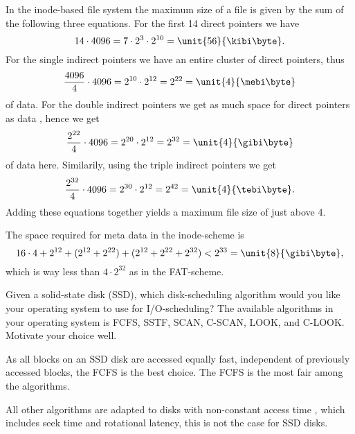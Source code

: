 \documentclass[a4paper]{miunasgn}
\begin{document}
\begin{questions}
\begin{solution}
		In the inode-based file system the maximum size of a file is given by the 
		sum of the following three equations.
		For the first 14 direct pointers we have
		\begin{equation}
			\label{eq:direct}
			14\cdot 4096 = 7\cdot 2^3\cdot 2^{10} = \unit{56}{\kibi\byte}.
		\end{equation}
		For the single indirect pointers we have an entire cluster of direct 
		pointers, thus
		\begin{equation}
			\label{eq:singleindirect}
			\frac{4096}{4}\cdot 4096 = 2^{10}\cdot 2^{12} = 2^{22} 
			= \unit{4}{\mebi\byte}
		\end{equation}
		of data.
		For the double indirect pointers we get as much space for direct pointers 
		as data , hence we get
		\begin{equation}
			\label{eq:doubleindirect}
			\frac{2^{22}}{4}\cdot 4096 = 2^{20}\cdot 2^{12} = 2^{32} 
			= \unit{4}{\gibi\byte}
		\end{equation}
		of data here.
		Similarily, using the triple indirect pointers we get
		\begin{equation}
			\label{eq:tripleindirect}
			\frac{2^{32}}{4}\cdot 4096 = 2^{30}\cdot 2^{12} = 2^{42} 
			= \unit{4}{\tebi\byte}.
		\end{equation}
		Adding these equations together yields a maximum file size of just above 
		\unit{4}{\tebi\byte}.

		The space required for meta data in the inode-scheme is \[
			16\cdot 4 + 2^{12} + ( 2^{12} + 2^{22} ) + ( 2^{12} + 2^{22} + 2^{32} 
			) < 2^{33} = \unit{8}{\gibi\byte},
		\] which is way less than \(4\cdot 2^{32}\) as in the FAT-scheme.
	\end{solution}

	\question\label{q:ssd}
	Given a solid-state disk (SSD), which disk-scheduling algorithm would you 
	like your operating system to use for I/O-scheduling?
	The available algorithms in your operating system is FCFS, SSTF, SCAN, 
	C-SCAN, LOOK, and C-LOOK.
	Motivate your choice well.
	\begin{solution}
		As all blocks on an SSD disk are accessed equally fast, independent of 
		previously accessed blocks, the FCFS is the best choice.
		The FCFS is the most fair among the algorithms.

		All other algorithms are adapted to disks with non-constant access time 
		\cite[cf. sec. 12.4]{Silberschatz2009osc}, which includes seek time and 
		rotational latency, this is not the case for SSD disks.
	\end{solution}


\end{questions}
\end{document}
